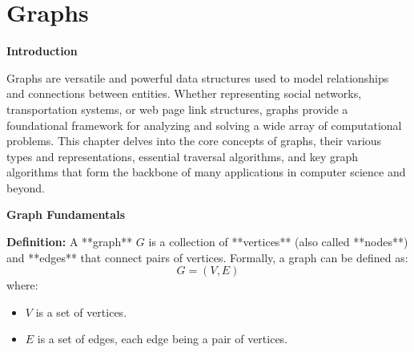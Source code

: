 
\chapter{Graphs}\label{chapter:graphs}

\textbf{Introduction}

Graphs are versatile and powerful data structures used to model relationships and connections between entities. Whether representing social networks, transportation systems, or web page link structures, graphs provide a foundational framework for analyzing and solving a wide array of computational problems. This chapter delves into the core concepts of graphs, their various types and representations, essential traversal algorithms, and key graph algorithms that form the backbone of many applications in computer science and beyond.

\textbf{Graph Fundamentals}

\textbf{Definition:}  
A **graph** \( G \) is a collection of **vertices** (also called **nodes**) and **edges** that connect pairs of vertices. Formally, a graph can be defined as:
\[
G = (V, E)
\]
where:
\begin{itemize}
    \item \( V \) is a set of vertices.
    \item \( E \) is a set of edges, each edge being a pair of vertices.
\end{itemize}


